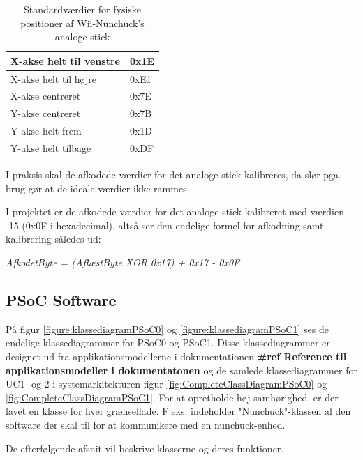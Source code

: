 \begin{table}[H]
	\centering
	\begin{tabular}{|l|l|}
		\hline
		X-akse helt til venstre & 0x1E \\ \hline
		X-akse helt til højre   & 0xE1 \\ \hline
		X-akse centreret        & 0x7E \\ \hline
		Y-akse centreret        & 0x7B \\ \hline
		Y-akse helt frem        & 0x1D \\ \hline
		Y-akse helt tilbage     & 0xDF \\ \hline
	\end{tabular}
	\caption{Standardværdier for fysiske positioner af Wii-Nunchuck's analoge stick}
	\label{tabel:WiiNunchuckStickPositioner}
\end{table}

I praksis skal de afkodede værdier for det analoge stick kalibreres, da slør pga. brug gør at de ideale værdier ikke rammes. 

I projektet er de afkodede værdier for det analoge stick kalibreret med værdien -15 (0x0F i hexadecimal), altså ser den endelige formel for afkodning samt kalibrering således ud:

\textit{AfkodetByte = (AflæstByte XOR 0x17) + 0x17 - 0x0F}

\subsection{PSoC Software}
På figur \ref{figure:klassediagramPSoC0} og \ref{figure:klassediagramPSoC1} ses de endelige klassediagrammer for PSoC0 og PSoC1. Disse klassediagrammer er designet ud fra applikationsmodellerne i dokumentationen \textbf{\#ref Reference til applikationsmodeller i dokumentatonen} og de samlede klassediagrammer for UC1- og 2 i systemarkitekturen figur \ref{fig:CompleteClassDiagramPSoC0} og \ref{fig:CompleteClassDiagramPSoC1}. For at opretholde høj samhørighed, er der lavet en klasse for hver grænseflade. F.eks. indeholder "Nunchuck"-klassen al den software der skal til for at kommunikere med en nunchuck-enhed. 

De efterfølgende afsnit vil beskrive klasserne og deres funktioner.

